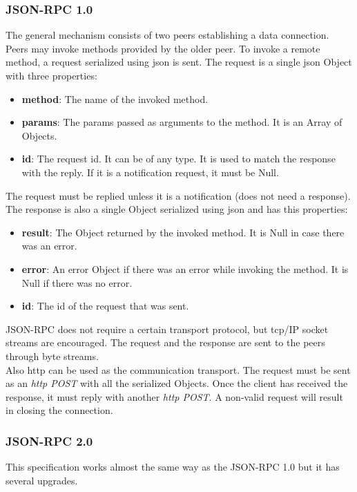 \documentclass[a4paper, 12pt]{article} %
\begin{document}
        \subsubsection{JSON-RPC 1.0}
            The general mechanism consists of two peers establishing a data connection\cite{json-rpc-1}. Peers may invoke methods provided by the older peer. To invoke a remote method, a request serialized using \acrshort{json} is sent. The request is a single \acrshort{json} Object with three properties: 
            \begin{itemize}
                \item \textbf{method}: The name of the invoked method.
                \item \textbf{params}: The params passed as arguments to the method. It is an Array of Objects.
                \item \textbf{id}: The request id. It can be of any type. It is used to match the response with the reply. If it is a notification request, it must be Null.
            \end{itemize}
            The request must be replied unless it is a notification (does not need a response). The response is also a single Object serialized using \acrshort{json} and has this properties:
            \begin{itemize}
                \item \textbf{result}: The Object returned by the invoked method. It is Null in case there was an error.
                \item \textbf{error}: An error Object if there was an error while invoking the method. It is Null if there was no error.
                \item \textbf{id}: The id of the request that was sent. 
            \end{itemize}
            JSON-RPC does not require a certain transport protocol, but \acrshort{tcp}/IP socket streams are encouraged. The request and the response are sent to the peers through byte streams.\\

            Also \acrshort{http} can be used as the communication transport. The request must be sent as an \textit{\acrshort{http} POST} with all the serialized Objects. Once the client has received the response, it must reply with another \textit{\acrshort{http} POST}. A non-valid request will result in closing the connection.
        \subsubsection{JSON-RPC 2.0}
            This specification\cite{json-rpc-2} works almost the same way as the JSON-RPC 1.0 but it has several upgrades.\\
            
\end{document}
